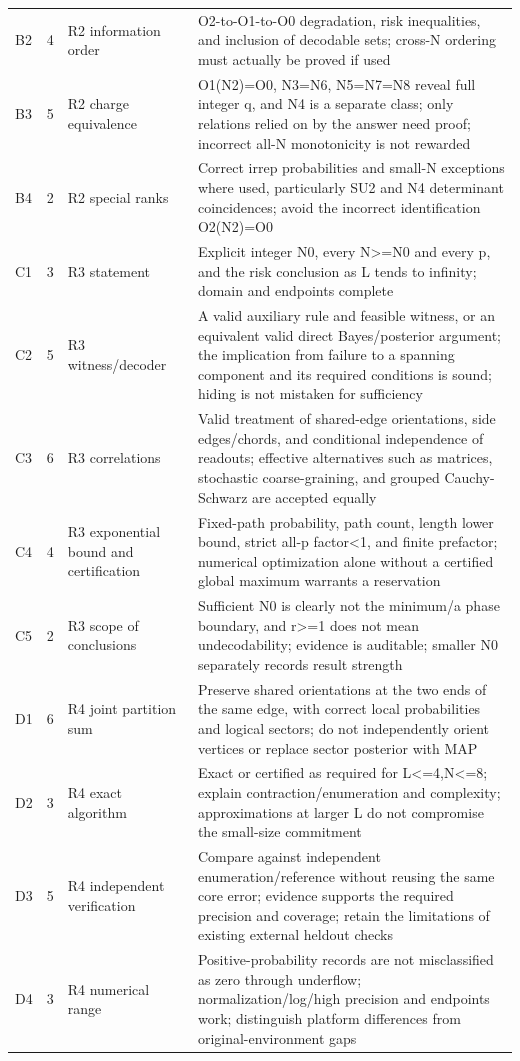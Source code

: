 \documentclass[11pt,a4paper]{article}
\begin{document}
{\begin{longtable}
{}B2 & 4 & R2 information order & O2-to-O1-to-O0 degradation, risk inequalities, and inclusion of decodable sets; cross-N ordering must actually be proved if used\tabularnewline
{}B3 & 5 & R2 charge equivalence & O1(N2)=O0, N3=N6, N5=N7=N8 reveal full integer q, and N4 is a separate class; only relations relied on by the answer need proof; incorrect all-N monotonicity is not rewarded\tabularnewline
{}B4 & 2 & R2 special ranks & Correct irrep probabilities and small-N exceptions where used, particularly SU2 and N4 determinant coincidences; avoid the incorrect identification O2(N2)=O0\tabularnewline
{}C1 & 3 & R3 statement & Explicit integer N0, every N>=N0 and every p, and the risk conclusion as L tends to infinity; domain and endpoints complete\tabularnewline
{}C2 & 5 & R3 witness/\allowbreak{}decoder & A valid auxiliary rule and feasible witness, or an equivalent valid direct Bayes/\allowbreak{}posterior argument; the implication from failure to a spanning component and its required conditions is sound; hiding is not mistaken for sufficiency\tabularnewline
{}C3 & 6 & R3 correlations & Valid treatment of shared-edge orientations, side edges/\allowbreak{}chords, and conditional independence of readouts; effective alternatives such as matrices, stochastic coarse-graining, and grouped Cauchy-Schwarz are accepted equally\tabularnewline
{}C4 & 4 & R3 exponential bound and certification & Fixed-path probability, path count, length lower bound, strict all-p factor<1, and finite prefactor; numerical optimization alone without a certified global maximum warrants a reservation\tabularnewline
{}C5 & 2 & R3 scope of conclusions & Sufficient N0 is clearly not the minimum/\allowbreak{}a phase boundary, and r>=1 does not mean undecodability; evidence is auditable; smaller N0 separately records result strength\tabularnewline
{}D1 & 6 & R4 joint partition sum & Preserve shared orientations at the two ends of the same edge, with correct local probabilities and logical sectors; do not independently orient vertices or replace sector posterior with MAP\tabularnewline
{}D2 & 3 & R4 exact algorithm & Exact or certified as required for L<=4,N<=8; explain contraction/\allowbreak{}enumeration and complexity; approximations at larger L do not compromise the small-size commitment\tabularnewline
{}D3 & 5 & R4 independent verification & Compare against independent enumeration/\allowbreak{}reference without reusing the same core error; evidence supports the required precision and coverage; retain the limitations of existing external heldout checks\tabularnewline
{}D4 & 3 & R4 numerical range & Positive-probability records are not misclassified as zero through underflow; normalization/\allowbreak{}log/\allowbreak{}high precision and endpoints work; distinguish platform differences from original-environment gaps\tabularnewline

\end{longtable}}
\end{document}
